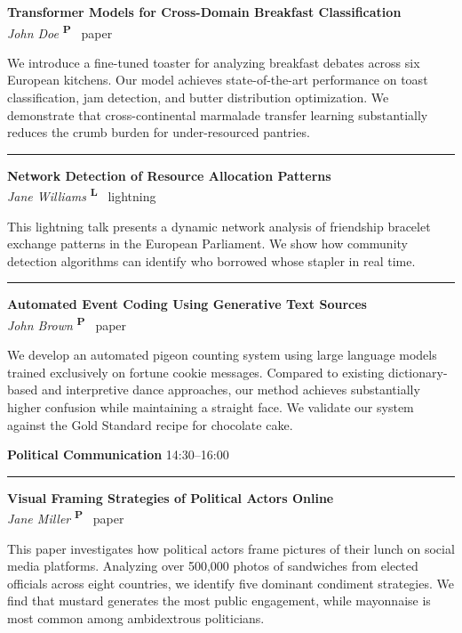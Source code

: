 \documentclass[
]{article}
\newcommand{\typeicon}[1]{%
  \textsuperscript{\sffamily\bfseries #1}%
}
\newcommand{\panelsection}[2][]{%
  \vspace{1.5em}%
  {\Large\bfseries #2}%
  \if\relax\detokenize{#1}\relax\else%
    \hfill{\small\textsf{#1}}%
  \fi%
  \vspace{0.5em}%
  \hrule%
  \vspace{0.8em}%
}
\newcommand{\papertitle}[1]{%
  {\large\bfseries #1}%
}
\newcommand{\paperauthor}[1]{%
  {\itshape #1}%
}
\newcommand{\paperentry}[4]{%
  \papertitle{#1}\\%
  \paperauthor{#2}\hfill #3~#4%
  \vspace{0.3em}\par%
}
\newcommand{\paperseparator}{%
  \vspace{0.8em}%
  \noindent\rule{0.3\textwidth}{0.4pt}%
  \vspace{0.5em}%
}
\begin{document}
\hypertarget{john-doe-transformer-models-for-cross-domain-breakfast-classification}{}
\paperentry{Transformer Models for Cross-Domain Breakfast Classification}{John Doe}{\typeicon{P}}{paper}

We introduce a fine-tuned toaster for analyzing breakfast debates across six European kitchens. Our model achieves state-of-the-art performance on toast classification, jam detection, and butter distribution optimization. We demonstrate that cross-continental marmalade transfer learning substantially reduces the crumb burden for under-resourced pantries. 

\paperseparator

\hypertarget{jane-williams-network-detection-of-resource-allocation-patterns}{}
\paperentry{Network Detection of Resource Allocation Patterns}{Jane Williams}{\typeicon{L}}{lightning}

This lightning talk presents a dynamic network analysis of friendship bracelet exchange patterns in the European Parliament. We show how community detection algorithms can identify who borrowed whose stapler in real time. 

\paperseparator

\hypertarget{john-brown-automated-event-coding-using-generative-text-sources}{}
\paperentry{Automated Event Coding Using Generative Text Sources}{John Brown}{\typeicon{P}}{paper}

We develop an automated pigeon counting system using large language models trained exclusively on fortune cookie messages. Compared to existing dictionary-based and interpretive dance approaches, our method achieves substantially higher confusion while maintaining a straight face. We validate our system against the Gold Standard recipe for chocolate cake. 

\clearpage
\hypertarget{political-communication}{}
\panelsection[14:30--16:00]{Political Communication}

\hypertarget{jane-miller-visual-framing-strategies-of-political-actors-online}{}
\paperentry{Visual Framing Strategies of Political Actors Online}{Jane Miller}{\typeicon{P}}{paper}

This paper investigates how political actors frame pictures of their lunch on social media platforms. Analyzing over 500,000 photos of sandwiches from elected officials across eight countries, we identify five dominant condiment strategies. We find that mustard generates the most public engagement, while mayonnaise is most common among ambidextrous politicians. 
\end{document}
